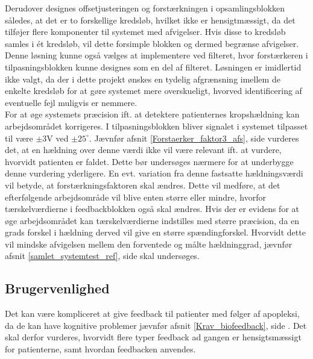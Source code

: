 Derudover designes offsetjusteringen og forstærkningen i opsamlingsblokken således, at det er to forskellige kredsløb, hvilket ikke er hensigtmæssigt, da det tilføjer flere komponenter til systemet med afvigelser. Hvis disse to kredsløb samles i ét kredsløb, vil dette forsimple blokken og dermed begrænse afvigelser. Denne løsning kunne også vælges at implementere ved filteret, hvor forstærkeren i tilpasningsblokken kunne designes som en del af filteret. Løsningen er imidlertid ikke valgt, da der i dette projekt ønskes en tydelig afgrænsning imellem de enkelte kredsløb for at gøre systemet mere overskueligt, hvorved identificering af eventuelle fejl muligvis er nemmere.\\

For at øge systemets præcision ift. at detektere patienternes kropshældning kan arbejdsområdet korrigeres. I tilpasningsblokken bliver signalet i systemet tilpasset til være $\pm3$V ved $\pm25^{\circ}$. Jævnfør afsnit \ref{Forstaerker_faktor3_afs}, side \pageref{Forstaerker_faktor3_afs} vurderes det, at en hældning over denne værdi ikke vil være relevant ift. at vurdere, hvorvidt patienten er faldet. Dette bør undersøges nærmere for at underbygge denne vurdering yderligere. En evt. variation fra denne fastsatte hældningsværdi vil betyde, at forstærkningsfaktoren skal ændres. Dette vil medføre, at det efterfølgende arbejdsområde vil blive enten større eller mindre, hvorfor tærskelværdierne i feedbackblokken også skal ændres. Hvis der er evidens for at øge arbejdsområdet kan tærskelværdierne indstilles med større præcision, da en grads forskel i hældning derved vil give en større spændingforskel. Hvorvidt dette vil mindske afvigelsen mellem den forventede og målte hældninggrad, jævnfør afsnit \ref{samlet_systemtest_ref}, side \pageref{samlet_systemtest_ref} skal undersøges. 

\subsection{Brugervenlighed}
Det kan være kompliceret at give feedback til patienter med følger af apopleksi, da de kan have kognitive problemer jævnfør afsnit \ref{Krav_biofeedback}, side \pageref{Krav_biofeedback}. Det skal derfor vurderes, hvorvidt flere typer feedback ad gangen er hensigtsmæssigt for patienterne, samt hvordan feedbacken anvendes.  

